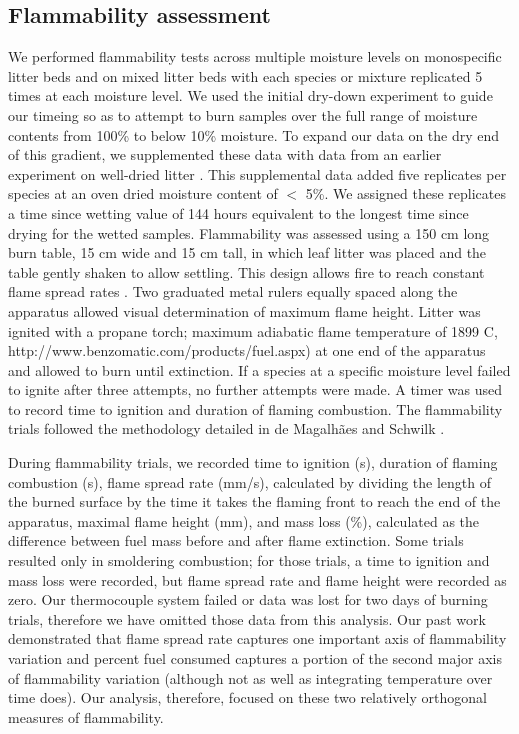\documentclass[fire,article,submit,moreauthors,pdftex]{Definitions/mdpi}
\begin{document}
\subsection{Flammability assessment}

We performed flammability tests across multiple moisture levels on monospecific
litter beds and on mixed litter beds with each species or mixture replicated 5
times at each moisture level. We used the initial dry-down experiment to guide
our timeing so as to attempt to burn samples over the full range of moisture
contents from 100\% to below 10\% moisture. To expand our data on the dry end
of this gradient, we supplemented these data with data from an earlier
experiment on well-dried litter \cite{Magalhaes+Schwilk-2012}. This
supplemental data added five replicates per species at an oven dried moisture
content of $<$ 5\%. We assigned these replicates a time since wetting value of
144 hours equivalent to the longest time since drying for the wetted samples.
Flammability was assessed using a 150 cm long burn table, 15 cm wide and 15 cm
tall, in which leaf litter was placed and the table gently shaken to allow
settling. This design allows fire to reach constant flame spread rates
\cite{Magalhaes+Schwilk-2012}. Two graduated metal rulers equally spaced along
the apparatus allowed visual determination of maximum flame height. Litter was
ignited with a propane torch; maximum adiabatic flame temperature of 1899 C,
http://www.benzomatic.com/products/fuel.aspx) at one end of the apparatus and
allowed to burn until extinction. If a species at a specific moisture level
failed to ignite after three attempts, no further attempts were made. A timer
was used to record time to ignition and duration of flaming combustion. The
flammability trials followed the methodology detailed in de Magalhães and
Schwilk \cite{Magalhaes+Schwilk-2012}.

 
During flammability trials, we recorded time to ignition (s), duration of
flaming combustion (s), flame spread rate (mm/s), calculated by dividing the
length of the burned surface by the time it takes the flaming front to reach
the end of the apparatus, maximal flame height (mm), and mass loss (\%),
calculated as the difference between fuel mass before and after flame
extinction. Some trials resulted only in smoldering combustion; for those
trials, a time to ignition and mass loss were recorded, but flame spread rate
and flame height were recorded as zero. Our thermocouple system failed or data
was lost for two days of burning trials, therefore we have omitted those data
from this analysis. Our past work \cite{Magalhaes+Schwilk-2012} demonstrated
that flame spread rate captures one important axis of flammability variation
\citep{Schwilk-2015, Pausas+Keeley+etal-2017} and percent fuel consumed
captures a portion of the second major axis of flammability variation (although
not as well as integrating temperature over time does). Our analysis,
therefore, focused on these two relatively orthogonal measures of flammability.
\end{document}
